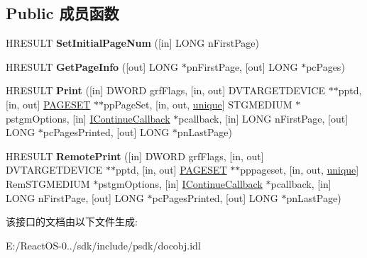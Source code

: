 \subsection*{Public 成员函数}
\begin{DoxyCompactItemize}
\item 
\mbox{\label{interface_i_print_a543710d263ed7fd6a4fca9cac997fc10}} 
H\+R\+E\+S\+U\+LT {\bfseries Set\+Initial\+Page\+Num} (\mbox{[}in\mbox{]} L\+O\+NG n\+First\+Page)
\item 
\mbox{\label{interface_i_print_a9d47a35a2f553645f0eb2bf34b1f8698}} 
H\+R\+E\+S\+U\+LT {\bfseries Get\+Page\+Info} (\mbox{[}out\mbox{]} L\+O\+NG $\ast$pn\+First\+Page, \mbox{[}out\mbox{]} L\+O\+NG $\ast$pc\+Pages)
\item 
\mbox{\label{interface_i_print_ad24787e6c3ed361a33423579cfaac243}} 
H\+R\+E\+S\+U\+LT {\bfseries Print} (\mbox{[}in\mbox{]} D\+W\+O\+RD grf\+Flags, \mbox{[}in, out\mbox{]} D\+V\+T\+A\+R\+G\+E\+T\+D\+E\+V\+I\+CE $\ast$$\ast$pptd, \mbox{[}in, out\mbox{]} \hyperlink{struct_i_print_1_1tag_p_a_g_e_s_e_t}{P\+A\+G\+E\+S\+ET} $\ast$$\ast$pp\+Page\+Set, \mbox{[}in, out, \hyperlink{interfaceunique}{unique}\mbox{]} S\+T\+G\+M\+E\+D\+I\+UM $\ast$pstgm\+Options, \mbox{[}in\mbox{]} \hyperlink{interface_i_continue_callback}{I\+Continue\+Callback} $\ast$pcallback, \mbox{[}in\mbox{]} L\+O\+NG n\+First\+Page, \mbox{[}out\mbox{]} L\+O\+NG $\ast$pc\+Pages\+Printed, \mbox{[}out\mbox{]} L\+O\+NG $\ast$pn\+Last\+Page)
\item 
\mbox{\label{interface_i_print_acdd7bf2837194446fc17483e697a3090}} 
H\+R\+E\+S\+U\+LT {\bfseries Remote\+Print} (\mbox{[}in\mbox{]} D\+W\+O\+RD grf\+Flags, \mbox{[}in, out\mbox{]} D\+V\+T\+A\+R\+G\+E\+T\+D\+E\+V\+I\+CE $\ast$$\ast$pptd, \mbox{[}in, out\mbox{]} \hyperlink{struct_i_print_1_1tag_p_a_g_e_s_e_t}{P\+A\+G\+E\+S\+ET} $\ast$$\ast$pppageset, \mbox{[}in, out, \hyperlink{interfaceunique}{unique}\mbox{]} Rem\+S\+T\+G\+M\+E\+D\+I\+UM $\ast$pstgm\+Options, \mbox{[}in\mbox{]} \hyperlink{interface_i_continue_callback}{I\+Continue\+Callback} $\ast$pcallback, \mbox{[}in\mbox{]} L\+O\+NG n\+First\+Page, \mbox{[}out\mbox{]} L\+O\+NG $\ast$pc\+Pages\+Printed, \mbox{[}out\mbox{]} L\+O\+NG $\ast$pn\+Last\+Page)
\end{DoxyCompactItemize}


该接口的文档由以下文件生成\+:\begin{DoxyCompactItemize}
\item 
E\+:/\+React\+O\+S-\/0../sdk/include/psdk/docobj.\+idl\end{DoxyCompactItemize}

